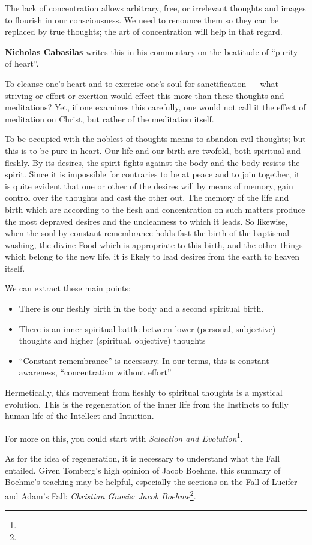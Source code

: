 The lack of concentration allows arbitrary, free, or irrelevant thoughts and images to flourish in our consciousness. We
need to renounce them so they can be replaced by true thoughts; the art of concentration will help in that regard.

\textbf{Nicholas Cabasilas} writes this in his commentary on the beatitude of “purity of heart”.

\begin{quotationx}
To cleanse one's heart and to exercise one's soul for sanctification
— what striving or effort or exertion would effect this more than these thoughts and meditations?
Yet, if one examines this carefully, one would not call it the effect of meditation on Christ, but rather of the
meditation itself.

To be occupied with the noblest of thoughts means to abandon evil thoughts; but this is to be pure in heart. Our life
and our birth are twofold, both spiritual and fleshly. By its desires, the spirit fights against the body and the body
resists the spirit. Since it is impossible for contraries to be at peace and to join together, it is quite evident that
one or other of the desires will by means of memory, gain control over the thoughts and cast the other out. The memory
of the life and birth which are according to the flesh and concentration on such matters produce the most depraved
desires and the uncleanness to which it leads. So likewise, when the soul by constant remembrance holds fast the birth
of the baptismal washing, the divine Food which is appropriate to this birth, and the other things which belong to the
new life, it is likely to lead desires from the earth to heaven itself. 

\end{quotationx}
We can extract these main points:

\begin{itemize}
\item There is our fleshly birth in the body and a second spiritual birth. 
\item There is an inner spiritual battle between lower (personal, subjective) thoughts and higher (spiritual, objective)
thoughts 
\item “Constant remembrance” is necessary. In our terms, this is constant awareness, “concentration without effort” 
\end{itemize}
Hermetically, this movement from fleshly to spiritual thoughts is a mystical evolution. This is the regeneration of the
inner life from the Instincts to fully human life of the Intellect and Intuition.

For more on this, you could start with \textit{Salvation and Evolution}\footnote{}.

As for the idea of regeneration, it is necessary to understand what the Fall entailed. Given
Tomberg's high opinion of Jacob Boehme, this summary of Boehme's teaching may
be helpful, especially the sections on the Fall of Lucifer and Adam's Fall: \textit{Christian Gnosis: Jacob Boehme}\footnote{}.

